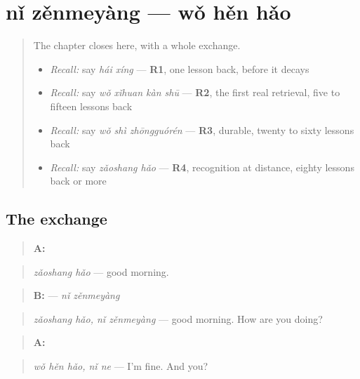\section[Practice]{nǐ zěnmeyàng — wǒ hěn hǎo}

\label{lesson:ZH-C30-practice}



\begin{quote}
The chapter closes here, with a whole exchange.

\begin{itemize}
\raggedright
  \item \emph{Recall:} say \emph{hái xíng} — \textbf{R1}, one lesson back, before it decays
  \item \emph{Recall:} say \emph{wǒ xǐhuan kàn shū} — \textbf{R2}, the first real retrieval, five to fifteen lessons back
  \item \emph{Recall:} say \emph{wǒ shì zhōngguórén} — \textbf{R3}, durable, twenty to sixty lessons back
  \item \emph{Recall:} say \emph{zǎoshang hǎo} — \textbf{R4}, recognition at distance, eighty lessons back or more
\end{itemize}
\end{quote}

\subsection*{The exchange}
\begin{quote}
\textbf{A:} 
\end{quote}

\begin{quote}
\emph{zǎoshang hǎo} — good morning.
\end{quote}

\begin{quote}
\textbf{B:}  — \emph{nǐ zěnmeyàng}
\end{quote}

\begin{quote}
\emph{zǎoshang hǎo, nǐ zěnmeyàng} — good morning. How are you doing?
\end{quote}

\begin{quote}
\textbf{A:}  
\end{quote}

\begin{quote}
\emph{wǒ hěn hǎo, nǐ ne} — I'm fine. And you?
\end{quote}

